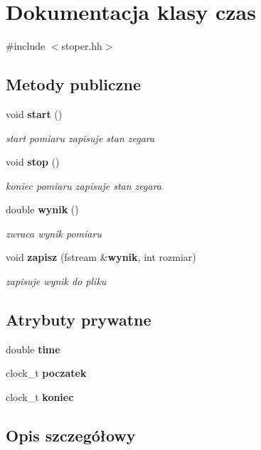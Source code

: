 \section{\-Dokumentacja klasy czas}
\label{classczas}


{\ttfamily \#include $<$stoper.\-hh$>$}

\subsection*{\-Metody publiczne}
\begin{DoxyCompactItemize}
\item 
void {\bf start} ()
\begin{DoxyCompactList}\small\item\em start pomiaru zapisuje stan zegara \end{DoxyCompactList}\item 
void {\bf stop} ()
\begin{DoxyCompactList}\small\item\em koniec pomiaru zapisuje stan zegara \end{DoxyCompactList}\item 
double {\bf wynik} ()
\begin{DoxyCompactList}\small\item\em zwraca wynik pomiaru \end{DoxyCompactList}\item 
void {\bf zapisz} (fstream \&{\bf wynik}, int rozmiar)
\begin{DoxyCompactList}\small\item\em zapisuje wynik do pliku \end{DoxyCompactList}\end{DoxyCompactItemize}
\subsection*{\-Atrybuty prywatne}
\begin{DoxyCompactItemize}
\item 
double {\bf time}
\item 
clock\-\_\-t {\bf poczatek}
\item 
clock\-\_\-t {\bf koniec}
\end{DoxyCompactItemize}


\subsection{\-Opis szczegółowy}


